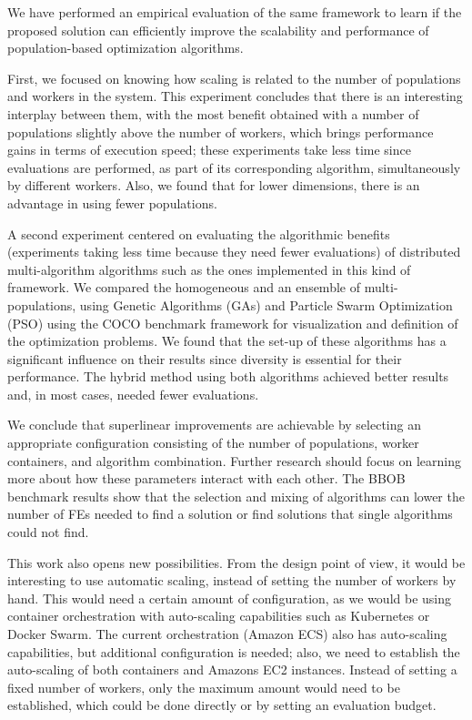 \documentclass[review]{elsarticle}
\begin{document}
We have performed an empirical evaluation of the same framework to learn if the proposed
solution can efficiently improve the scalability and performance of
population-based optimization algorithms.

First, we focused on knowing how scaling is related to the number of populations
and workers in the system. This experiment concludes that there is an
interesting interplay between them, with the most benefit obtained with a number of
populations slightly above the number of workers, which brings performance gains
in terms of execution speed; these experiments take less time since
evaluations are performed, as part of its corresponding algorithm, simultaneously by different workers.
Also, we found that for lower dimensions, there is an advantage in using fewer
populations.

A second experiment centered on evaluating the algorithmic benefits
(experiments taking less time because they need fewer evaluations) of
distributed multi-algorithm algorithms such as the ones implemented in
this kind of framework.  We compared the homogeneous and an ensemble
of multi-populations, using Genetic Algorithms (GAs) and Particle
Swarm Optimization (PSO) using the COCO benchmark framework for
visualization and definition of the optimization problems.  We found
that the set-up of these algorithms has a significant influence on
their results since diversity is essential for their performance. The
hybrid method using both algorithms achieved better results and, in
most cases, needed fewer evaluations.

We conclude that superlinear improvements are achievable by selecting an
appropriate configuration consisting of the number of populations, worker
containers, and algorithm combination. Further research should focus on learning
more about how these parameters interact with each other. The BBOB benchmark
results show that the selection and mixing of algorithms can lower the number of
FEs needed to find a solution or find solutions that single algorithms could not
find.

This work also opens new possibilities. From the design point of view, it would
be interesting to use automatic scaling, instead of setting the number of
workers by hand. This would need a certain amount of configuration, as we would
be using container orchestration with auto-scaling capabilities such as
Kubernetes or Docker Swarm. The current orchestration (Amazon ECS) also has
auto-scaling capabilities, but additional configuration is needed; also, we need
to establish the auto-scaling of both containers and Amazons EC2 instances.
Instead of setting a fixed number of workers, only the maximum amount would need
to be established, which could be done directly or by setting an evaluation
budget.
\end{document}
